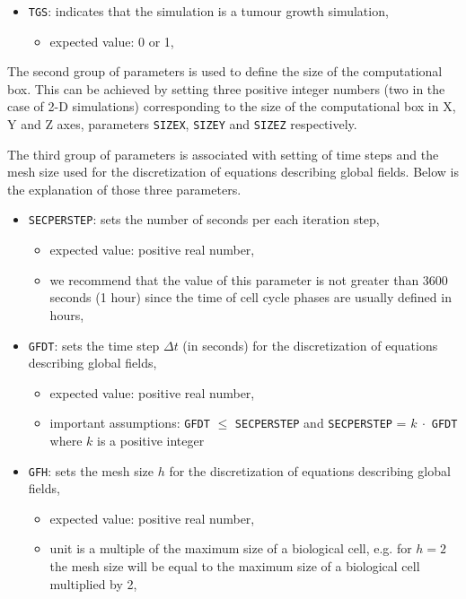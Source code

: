 \documentclass[10pt]{article}
\begin{document}
\begin{itemize}
\item {\tt TGS}: indicates that the simulation is a tumour growth simulation,
\begin{itemize}
\item expected value: 0 or 1,
\end{itemize}

\end{itemize}

\indent The second group of parameters is used to define the size of the computational box. This can be achieved by setting three positive integer numbers (two in the case of 2-D simulations) corresponding to the size of the computational box in X, Y and Z axes, parameters {\tt SIZEX}, {\tt SIZEY} and {\tt SIZEZ} respectively.

\indent The third group of parameters is associated with setting of time steps and the mesh size used for the discretization of equations describing global fields. Below is the explanation of those three parameters.

\begin{itemize}
\item {\tt SECPERSTEP}: sets the number of seconds per each iteration step,
\begin{itemize}
\item expected value: positive real number,
\item we recommend that the value of this parameter is not greater than 3600 seconds (1 hour) since the time of cell cycle phases are usually defined in hours,
\end{itemize}

\item {\tt GFDT}: sets the time step $\Delta t$ (in seconds) for the discretization of equations describing global fields,
\begin{itemize}
\item expected value: positive real number,
\item important assumptions: {\tt GFDT} $\le$ {\tt SECPERSTEP} and {\tt SECPERSTEP} = $k\ \cdot$ {\tt GFDT} where $k$ is a positive integer
\end{itemize}

\item {\tt GFH}: sets the mesh size $h$ for the discretization of equations describing global fields,
\begin{itemize}
\item expected value: positive real number,
\item unit is a multiple of the maximum size of a biological cell, e.g. for $h=2$ the mesh size will be equal to the maximum size of a biological cell multiplied by 2,
\end{itemize}

\end{itemize}
\end{document}
